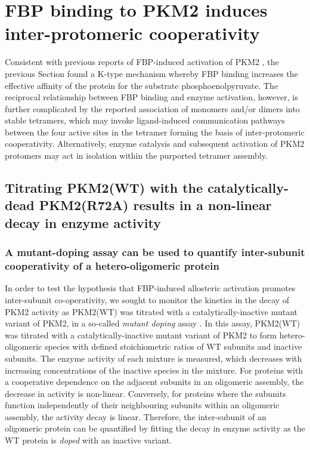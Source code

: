 \section{FBP binding to PKM2 induces inter-protomeric cooperativity}
Consistent with previous reports of FBP-induced activation of PKM2 \cite{Jurica:1998aa,Ikeda:1998aa,Dombrauckas:2005aa}, the previous Section found a K-type mechanism whereby FBP binding increases the effective affinity of the protein for the substrate phosphoenolpyruvate.  The reciprocal relationship between FBP binding and enzyme activation, however, is further complicated by the reported association of monomers and/or dimers into stable tetramers, which may invoke ligand-induced communication pathways between the four active sites in the tetramer forming the basis of inter-protomeric cooperativity. Alternatively, enzyme catalysis and subsequent activation of PKM2 protomers may act in isolation within the purported tetramer assembly.


\subsection{Titrating PKM2(WT) with the catalytically-dead PKM2(R72A) results in a non-linear decay in enzyme activity}
\label{subsec:exp_mutant_doping}

\subsubsection{A mutant-doping assay can be used to quantify inter-subunit cooperativity of a hetero-oligomeric protein}
In order to test the hypothesis that FBP-induced allosteric activation promotes inter-subunit co-operativity, we sought to monitor the kinetics in the decay of PKM2 activity as PKM2(WT) was titrated with a catalytically-inactive mutant variant of PKM2, in a so-called \textit{mutant doping} assay \cite{Moreau:2007aa,Rzechorzek:2014aa,Barry:2009aa,Crampton:2006aa}. In this assay, PKM2(WT) was titrated with a catalytically-inactive mutant variant of PKM2 to form hetero-oligomeric species with defined stoichiometric ratios of WT subunits and inactive subunits. The enzyme activity of each mixture is measured, which decreases with increasing concentrations of the inactive species in the mixture. For proteins with a cooperative dependence on the adjacent subunits in an oligomeric assembly, the decrease in activity is non-linear. Conversely, for proteins where the subunits function independently of their neighbouring subunits within an oligomeric assembly, the activity decay is linear. Therefore, the inter-subunit of an oligomeric protein can be quantified by fitting the decay in enzyme activity as the WT protein is \textit{doped} with an inactive variant. 

